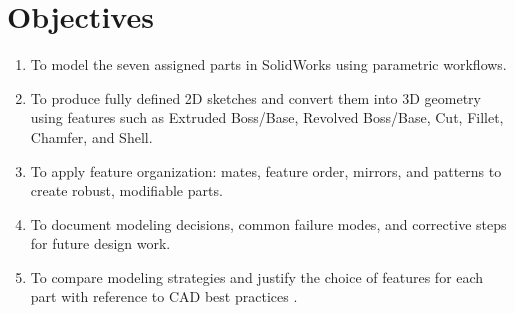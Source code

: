 \section{Objectives}
\begin{enumerate}
	\setlength{\itemsep}{0pt}
	      \setlength{\parskip}{0pt}
	      \setlength{\parsep}{0pt}
	\item To model the seven assigned parts in SolidWorks using parametric workflows.
	\item To produce fully defined 2D sketches and convert them into 3D geometry using features such as Extruded Boss/Base, Revolved Boss/Base, Cut, Fillet, Chamfer, and Shell.
	\item To apply feature organization: mates, feature order, mirrors, and patterns to create robust, modifiable parts.
	\item To document modeling decisions, common failure modes, and corrective steps for future design work.
	\item To compare modeling strategies and justify the choice of features for each part with reference to CAD best practices \cite{lab_01_solidworks_bible,lab_01_cad_fundamentals}.
\end{enumerate}
